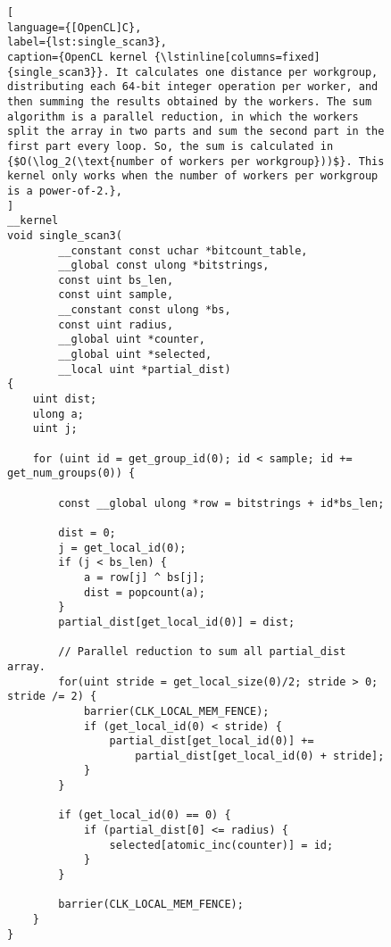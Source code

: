 \begin{figure}[!p]
\begin{lstlisting}[
language={[OpenCL]C},
label={lst:single_scan3},
caption={OpenCL kernel {\lstinline[columns=fixed]{single_scan3}}. It calculates one distance per workgroup, distributing each 64-bit integer operation per worker, and then summing the results obtained by the workers. The sum algorithm is a parallel reduction, in which the workers split the array in two parts and sum the second part in the first part every loop. So, the sum is calculated in {$O(\log_2(\text{number of workers per workgroup}))$}. This kernel only works when the number of workers per workgroup is a power-of-2.},
]
__kernel
void single_scan3(
        __constant const uchar *bitcount_table,
        __global const ulong *bitstrings,
        const uint bs_len,
        const uint sample,
        __constant const ulong *bs,
        const uint radius,
        __global uint *counter,
        __global uint *selected,
        __local uint *partial_dist)
{
    uint dist;
    ulong a;
    uint j;

    for (uint id = get_group_id(0); id < sample; id += get_num_groups(0)) {

        const __global ulong *row = bitstrings + id*bs_len;

        dist = 0;
        j = get_local_id(0);
        if (j < bs_len) {
            a = row[j] ^ bs[j];
            dist = popcount(a);
        }
        partial_dist[get_local_id(0)] = dist;

        // Parallel reduction to sum all partial_dist array.
        for(uint stride = get_local_size(0)/2; stride > 0; stride /= 2) {
            barrier(CLK_LOCAL_MEM_FENCE);
            if (get_local_id(0) < stride) {
                partial_dist[get_local_id(0)] +=
                    partial_dist[get_local_id(0) + stride];
            }
        }

        if (get_local_id(0) == 0) {
            if (partial_dist[0] <= radius) {
                selected[atomic_inc(counter)] = id;
            }
        }

        barrier(CLK_LOCAL_MEM_FENCE);
    }
}
\end{lstlisting}
\end{figure}

